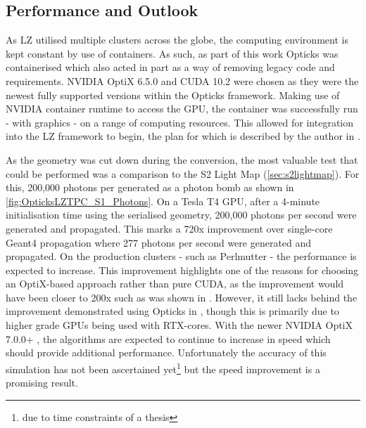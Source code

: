 \subsection{Performance and Outlook}
\par
As LZ utilised multiple clusters across the globe, the computing environment is kept constant by use of containers.
As such, as part of this work Opticks was containerised \cite{opticks_docker_ref} which also acted in part as a way of removing legacy code and requirements.
NVIDIA OptiX 6.5.0 and CUDA 10.2 were chosen as they were the newest fully supported versions within the Opticks framework.
Making use of NVIDIA container runtime to access the GPU, the container was successfully run - with graphics - on a range of computing resources.
This allowed for integration into the LZ framework to begin, the plan for which is described by the author in \cite{SEriksen_Opticks_CHEP_2021_ref,lz_status_with_opticks_ref}.
\par
As the geometry was cut down during the conversion, the most valuable test that could be performed was a comparison to the S2 Light Map (\autoref{sec:s2lightmap}).
For this, 200,000 photons per generated as a photon bomb as shown in \autoref{fig:OpticksLZTPC_S1_Photons}.
On a Tesla T4 GPU, after a 4-minute initialisation time using the serialised geometry, 200,000 photons per second were generated and propagated.
This marks a 720x improvement over single-core Geant4 propagation where 277 photons per second were generated and propagated.
On the production clusters - such as Perlmutter - the performance is expected to increase.
This improvement highlights one of the reasons for choosing an OptiX-based approach rather than pure CUDA, as the improvement would have been closer to 200x such as was shown in \cite{chroma_presentation_ref}.
However, it still lacks behind the improvement demonstrated using Opticks in \cite{Opticks_CHEP_2019_ref}, though this is primarily due to higher grade GPUs being used with RTX-cores.
With the newer NVIDIA OptiX 7.0.0+ \cite{NVidiaOptiX_7_ref}, the algorithms are expected to continue to increase in speed which should provide additional performance.
Unfortunately the accuracy of this simulation has not been ascertained yet\footnote{due to time constraints of a thesis} but the speed improvement is a promising result.
